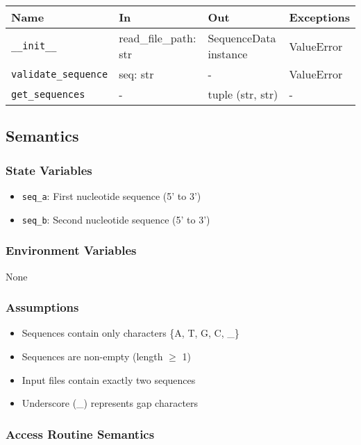 \documentclass[12pt, titlepage]{article}
\begin{document}
\begin{center}
\begin{tabular}{p{4cm} p{4cm} p{3cm} p{2cm}}
\hline
\textbf{Name} & \textbf{In} & \textbf{Out} & \textbf{Exceptions} \\
\hline
\texttt{\_\_init\_\_} & read\_file\_path: str & SequenceData instance & ValueError \\
\texttt{validate\_sequence} & seq: str & - & ValueError \\
\texttt{get\_sequences} & - & tuple (str, str) & - \\
\hline
\end{tabular}
\end{center}

\subsection{Semantics}

\subsubsection{State Variables}

\begin{itemize}
    \item \texttt{seq\_a}: First nucleotide sequence (5' to 3')
    \item \texttt{seq\_b}: Second nucleotide sequence (5' to 3')
\end{itemize}

\subsubsection{Environment Variables}

None

\subsubsection{Assumptions}

\begin{itemize}
    \item Sequences contain only characters \{A, T, G, C, \_\}
    \item Sequences are non-empty (length $\geq$ 1)
    \item Input files contain exactly two sequences
    \item Underscore (\_) represents gap characters
\end{itemize}

\subsubsection{Access Routine Semantics}
\end{document}
